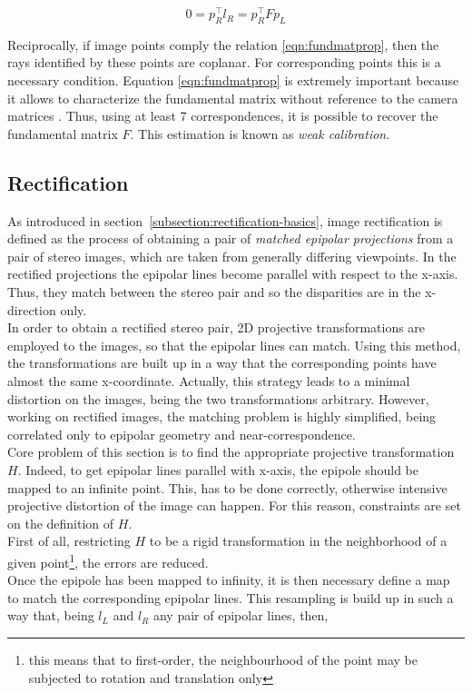 \begin{equation}
	0 = p_R^\top l_R = p_R^\top F p_L
\end{equation}

Reciprocally, if image points comply the relation \ref{eqn:fundmatprop}, then the rays identified by these points are coplanar. 
For corresponding points this is a necessary condition.
Equation \ref{eqn:fundmatprop} is extremely important because it allows to characterize the fundamental matrix without reference to the camera matrices \cite{hartley2004multiple}.
Thus, using at least 7 correspondences, it is possible to recover the fundamental matrix $F$. 
This estimation is known as \textit{weak calibration}.\\

\subsection{Rectification}
\label{subsection:rectification}

As introduced in section~\ref{subsection:rectification-basics}, image rectification is defined as the process of obtaining a pair of \textit{matched epipolar projections} from a pair of stereo images, which are taken from generally differing viewpoints.
In the rectified projections the epipolar lines become parallel with respect to the x-axis. 
Thus, they match between the stereo pair and so the disparities are in the x-direction only.\\
In order to obtain a rectified stereo pair, 2D projective transformations are employed to the images, so that the epipolar lines can match.
Using this method, the transformations are built up in a way that the corresponding points have almost the same x-coordinate.
Actually, this strategy leads to a minimal distortion on the images, being the two transformations arbitrary. 
However, working on rectified images, the matching problem is highly simplified, being correlated only to epipolar geometry and near-correspondence. \\
Core problem of this section is to find the appropriate projective transformation $H$. 
Indeed, to get epipolar lines parallel with x-axis, the epipole should be mapped to an infinite point. 
This, has to be done correctly, otherwise intensive projective distortion of the image can happen.
For this reason, constraints are set on the definition of $H$.\\
First of all, restricting $H$ to be a rigid transformation in the neighborhood of a given point\footnote{this means that to first-order, the neighbourhood of the point may be subjected to rotation and translation only}, the errors are reduced.\\
Once the epipole has been mapped to infinity, it is then necessary define a map to match the corresponding epipolar lines.
This resampling is build up in such a way that, being $l_L$ and $l_R$ any pair of epipolar lines, then,

